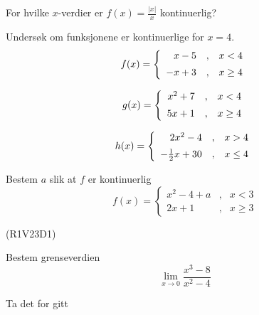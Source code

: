 





\opgt

For hvilke $ x $-verdier er $ f(x)=\frac{|x|}{x} $ kontinuerlig?

Undersøk om funksjonene er kontinuerlige for $ x=4 $.
\begin{equation*}
	f(x)= \left\lbrace{
		\begin{array}{rcr}
			x-5 &,&x<4 \br
			-x+3   &,& x\geq 4
		\end{array}
	}\right. 
\end{equation*}

\begin{equation*}
	g(x)= \left\lbrace{
		\begin{array}{rcr}
			x^2+7 &,&x<4 \br
			5x+1   &,& x\geq 4
		\end{array}
	}\right. 
\end{equation*}

\begin{equation*}
	h(x)= \left\lbrace{
		\begin{array}{rcr}
			2x^2-4 &,&x>4 \br
			-\frac{1}{2}x+30   &,& x\leq 4
		\end{array}
	}\right. 
\end{equation*}

Bestem $ a $ slik at $ f $ er kontinuerlig
\begin{equation*}
	f(x)= \left\lbrace{
		\begin{array}{rcr}
			x^2 - 4 + a &,& x < 3 \\
			2x + 1 & ,& x \geq 3
		\end{array}
	}\right. 
\end{equation*}

\newpage
{} (R1V23D1) \os

Bestem grenseverdien
\[ \lim\limits_{x\to0}\frac{x^3-8}{x^2-4} \]

Ta det for gitt 


